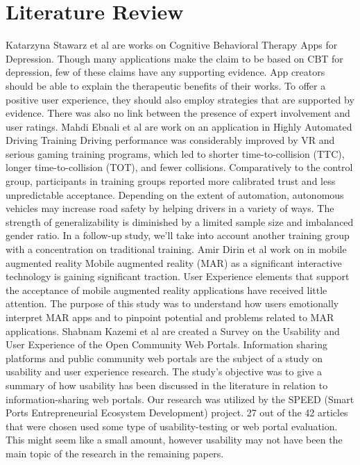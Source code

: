 \documentclass[runningheads]{llncs}
\begin{document}
\section{Literature Review}
Katarzyna Stawarz et al are works on Cognitive Behavioral Therapy Apps for Depression. Though many applications make the claim to be based on CBT for depression, few of these claims have any supporting evidence. App creators should be able to explain the therapeutic benefits of their works. To offer a positive user experience, they should also employ strategies that are supported by evidence. There was also no link between the presence of expert involvement and user ratings.
Mahdi Ebnali et al are work on an application in Highly Automated Driving Training Driving performance was considerably improved by VR and serious gaming training programs, which led to shorter time-to-collision (TTC), longer time-to-collision (TOT), and fewer collisions. Comparatively to the control group, participants in training groups reported more calibrated trust and less unpredictable acceptance. Depending on the extent of automation, autonomous vehicles may increase road safety by helping drivers in a variety of ways. The strength of generalizability is diminished by a limited sample size and imbalanced gender ratio. In a follow-up study, we'll take into account another training group with a concentration on traditional training.
Amir Dirin et al work on in mobile augmented reality Mobile augmented reality (MAR) as a significant interactive technology is gaining significant traction. User Experience elements that support the acceptance of mobile augmented reality applications have received little attention. The purpose of this study was to understand how users emotionally interpret MAR apps and to pinpoint potential and problems related to MAR applications.
Shabnam Kazemi et al are created a Survey on the Usability and User Experience of the Open Community Web Portals.
Information sharing platforms and public community web portals are the subject of a study on usability and user experience research. The study's objective was to give a summary of how usability has been discussed in the literature in relation to information-sharing web portals. Our research was utilized by the SPEED (Smart Ports Entrepreneurial Ecosystem Development) project. 27 out of the 42 articles that were chosen used some type of usability-testing or web portal evaluation. This might seem like a small amount, however usability may not have been the main topic of the research in the remaining papers.
\end{document}
